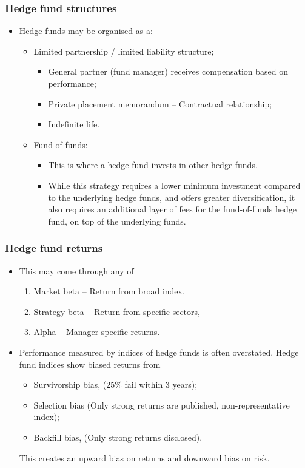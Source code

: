 \documentclass[../notes_compiled.tex]{subfiles}
\begin{document}
\subsubsection{Hedge fund structures}
\begin{itemize}
\item Hedge funds may be organised as a:
\begin{itemize}
\item Limited partnership / limited liability structure;
\begin{itemize}
\item General partner (fund manager) receives compensation based on performance;
\item Private placement memorandum -- Contractual relationship;
\item Indefinite life.
\end{itemize}
\item Fund-of-funds:
\begin{itemize}
\item This is where a hedge fund invests in other hedge funds.
\item While this strategy requires a lower minimum investment compared to the underlying hedge funds, and offers greater diversification, it also requires an additional layer of fees for the fund-of-funds hedge fund, on top of the underlying funds.
\end{itemize}
\end{itemize}
\end{itemize}

\subsubsection{Hedge fund returns}
\begin{itemize}
\item This may come through any of
\begin{enumerate}
\item Market beta -- Return from broad index,
\item Strategy beta -- Return from specific sectors,
\item Alpha -- Manager-specific returns.
\end{enumerate}
\item Performance measured by indices of hedge funds is often overstated. Hedge fund indices show biased returns from
\begin{itemize}
\item Survivorship bias, (25\% fail within 3 years);
\item Selection bias (Only strong returns are published, non-representative index);
\item Backfill bias, (Only strong returns disclosed).
\end{itemize}
This creates an upward bias on returns and downward bias on risk.
\end{itemize}
\end{document}
